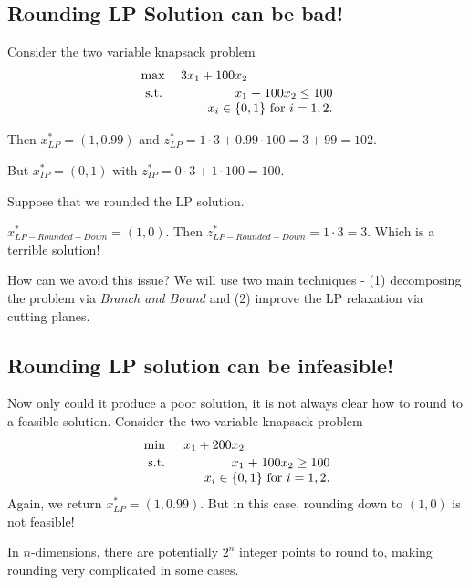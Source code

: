   
  
  \subsection{Rounding LP Solution can be bad!}
  \label{subsec:rounding-bad}

  Consider the two variable knapsack problem
  \[
  \begin{array}{l r@{\;}c@{\;}r@{\;}c@{\;}r}
  \max & 3x_1 + 100 x_2 & & & & \\[2pt]
  \st  & x_1 & + & 100 x_2 & \leq & 100 \\
       & \multicolumn{5}{r}{x_i \in \{0,1\} \text{ for } i=1,2.}
  \end{array}
  \]
  
  Then $x^*_{LP} = (1, 0.99)$ and $z^*_{LP} = 1\cdot 3 + 0.99\cdot 100 = 3 + 99 = 102.$
  
  But $x^*_{IP} = (0,1)$ with $z^*_{IP} = 0\cdot 3 + 1 \cdot 100 = 100$.
  
  Suppose that we rounded the LP solution.  
  
  $x^*_{LP-Rounded-Down} = (1,0)$.  Then $z^*_{LP-Rounded-Down} = 1\cdot 3 = 3$.  Which is a terrible solution!
  
  
  How can we avoid this issue?  We will use two main techniques - (1) decomposing the problem via \emph{Branch and Bound} and (2) improve the LP relaxation via cutting planes.
    
  \subsection{Rounding LP solution can be infeasible!}
  \label{subsec:rounding-infeasible}
  Now only could it produce a poor solution, it is not always clear how to round to a feasible solution.  
    Consider the two variable knapsack problem
  \[
  \begin{array}{l r@{\;}c@{\;}r@{\;}c@{\;}r}
  \min & x_1 + 200 x_2 & & & & \\[2pt]
  \st  & x_1 & + & 100 x_2 & \geq & 100 \\
       & \multicolumn{5}{r}{x_i \in \{0,1\} \text{ for } i=1,2.}
  \end{array}
  \]
  Again, we return  $x^*_{LP} = (1, 0.99)$.  But in this case, rounding down to $(1,0)$ is not feasible!
  
  In $n$-dimensions, there are potentially $2^n$ integer points to round to, making rounding very complicated in some cases.
 

